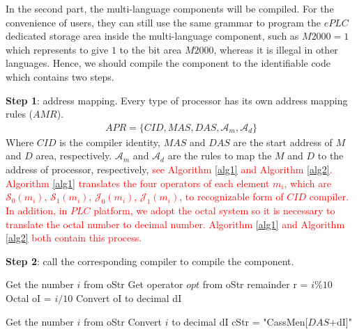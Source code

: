 \documentclass[journal,UTF8]{IEEEtran}
\begin{document}
 In the second part, the multi-language components will be compiled. For the convenience of users, they can still use the same grammar to program the $ePLC$ dedicated storage area inside the multi-language component, such as $M2000=1$ which represents to give $1$ to the bit area $M2000$, whereas it is illegal in other languages. Hence, we should compile the component to the identifiable code which contains two steps.
 	
\textbf{Step 1}: address mapping. Every type of processor has its own address mapping rules ($AMR$).
 \begin{eqnarray}
  APR = \{CID, MAS, DAS, \mathcal{A}_m, \mathcal{A}_d\}
 \end{eqnarray}
 Where $CID$ is the compiler identity, $MAS$ and $DAS$ are the start address of $M$ and $D$ area, respectively. $\mathcal{A}_m$ and $\mathcal{A}_d$ are the rules to map the $M$ and $D$ to the address of processor, respectively, \textcolor{red}{see Algorithm \ref{alg1} and Algorithm \ref{alg2}. Algorithm \ref{alg1} translates the four operators of each element $m_i$, which are $\mathcal{S}_0(m_i)$, $\mathcal{S}_1(m_i)$, $\mathcal{J}_0(m_i)$, $\mathcal{J}_1(m_i)$, to recognizable form of $CID$ compiler. In addition, in $PLC$ platform, we adopt the octal system so it is necessary to translate the octal number to decimal number. Algorithm \ref{alg1} and Algorithm \ref{alg2} both contain this process.
 }
 
\textbf{Step 2}: call the corresponding compiler to compile the component.


\begin{algorithm}
	\label{alg1}
	\caption{$\mathcal{A}_m$}%
	Get the number $i$ from oStr\; 
	Get operator $opt$ from oStr\;
	remainder r = $i\%10$\;
	Octal oI =  $i/10$\;
	Convert oI to decimal dI\; 
\end{algorithm}
\begin{algorithm}
	\label{alg2}
	\caption{$\mathcal{A}_d$}%
	Get the number $i$ from oStr\; 
	Convert $i$ to decimal dI\; 
	cStr = "CassMen[$DAS$+dI]"\;
\end{algorithm}
\end{document}
